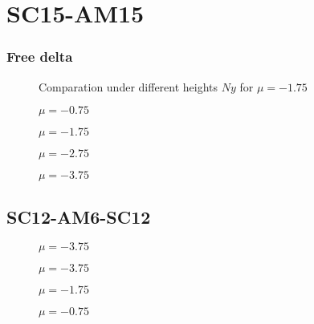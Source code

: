 \documentclass[../main.tex]{subfiles}
\begin{document}
\section{SC15-AM15}

\subsubsection{Free delta}
\begin{figure}[H]
    
    \caption{Comparation under different heights $Ny$ for $\mu = -1.75$}
\end{figure}
\begin{figure}[H]
    
    \caption{$\mu = -0.75$}
\end{figure}
\begin{figure}[H]
    
    \caption{$\mu = -1.75$}
\end{figure}
\begin{figure}[H]
    
    \caption{$\mu = -2.75$}
\end{figure}
\begin{figure}[H]
    
    \caption{$\mu = -3.75$}
\end{figure}

\subsection{SC12-AM6-SC12}
\begin{figure}[H]
    
    \caption{$\mu = -3.75$}
\end{figure}
\begin{figure}[H]
    
    \caption{$\mu = -3.75$}
\end{figure}

\begin{figure}[H]
    
    \caption{$\mu = -1.75$}
\end{figure}
\begin{figure}[H]
    
    \caption{$\mu = -0.75$}
\end{figure}
\end{document}
